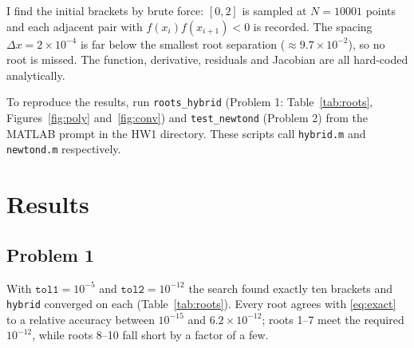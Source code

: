 \documentclass[11pt]{article}
\begin{document}
I find the initial brackets by brute force: $[0,2]$ is sampled at $N = 10001$
points and each adjacent pair with $f(x_i) f(x_{i+1}) < 0$ is recorded. The
spacing $\Delta x = 2\times 10^{-4}$ is far below the smallest root separation
($\approx 9.7 \times 10^{-2}$), so no root is missed. The function, derivative,
residuals and Jacobian are all hard-coded analytically.

To reproduce the results, run \texttt{roots\_hybrid} (Problem 1:
Table~\ref{tab:roots}, Figures~\ref{fig:poly} and~\ref{fig:conv}) and
\texttt{test\_newtond} (Problem 2) from the MATLAB prompt in the HW1
directory. These scripts call \texttt{hybrid.m} and \texttt{newtond.m}
respectively.

\section{Results}
\label{sec:results}

\subsection{Problem 1}

With $\texttt{tol1} = 10^{-5}$ and $\texttt{tol2} = 10^{-12}$ the search found
exactly ten brackets and \texttt{hybrid} converged on each
(Table~\ref{tab:roots}). Every root agrees with \eqref{eq:exact} to a relative
accuracy between $10^{-15}$ and $6.2\times10^{-12}$; roots 1--7 meet the required $10^{-12}$, while roots 8--10 fall short by a factor of a few.
\end{document}
